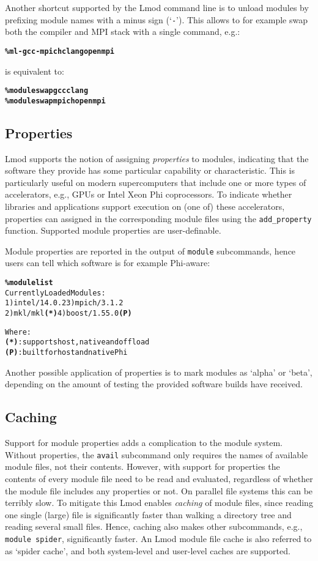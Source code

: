 Another shortcut supported by the Lmod command line is to unload modules by
prefixing module names with a minus sign (`\texttt{\small-}'). This allows to for
example swap both the compiler and MPI stack with a single command, e.g.:
{\small
  \begin{alltt}
      \textbf{\% ml -gcc -mpich clang openmpi}\
  \end{alltt}
}
\noindent
is equivalent to:
{\small
  \begin{alltt}
      \textbf{\% module swap gcc clang}
      \textbf{\% module swap mpich openmpi}\
  \end{alltt}
}

\subsection{Properties}

Lmod supports the notion of assigning \emph{properties} to modules,
indicating that the software they provide has some particular capability or
characteristic. This is particularly useful on modern supercomputers that include
one or more types of accelerators, e.g., GPUs or Intel Xeon Phi coprocessors.
To indicate whether libraries and applications support execution on (one of) these
accelerators, properties can assigned in the corresponding module files
using the \texttt{\small add\_property} function. Supported module
properties are user-definable.

Module properties are reported in the output of \texttt{\small module} subcommands,
hence users can tell which software is for example Phi-aware:
{\small
\begin{alltt}
  \textbf{\% module list}
  Currently Loaded Modules:
    1) intel/14.0.2       3) mpich/3.1.2
    2) mkl/mkl      \textbf{(*)}   4) boost/1.55.0 \textbf{(P)}

  Where:
   \textbf{(*)}:  supports host, native and offload
   \textbf{(P)}:  built for host and native Phi
\end{alltt}
}
\noindent Another possible application of properties is to mark modules as `alpha'
or `beta', depending on the amount of testing the provided software builds have
received.

\subsection{Caching}

Support for module properties adds a complication to the module
system.  Without properties, the \texttt{\small avail} subcommand only requires the
names of available module files, not their contents.  However, with support for
properties the contents of every module file need to be read and evaluated,
regardless of whether the module file includes any properties or not. On parallel
file systems this can be terribly slow.  To mitigate this Lmod enables
\emph{caching} of module files, since reading one single (large) file is
significantly faster than walking a directory tree and reading several small files.
Hence, caching also makes other subcommands, e.g., \texttt{\small module spider},
significantly faster. An Lmod module file cache is also referred to as
`spider cache', and both system-level and user-level caches are supported.

